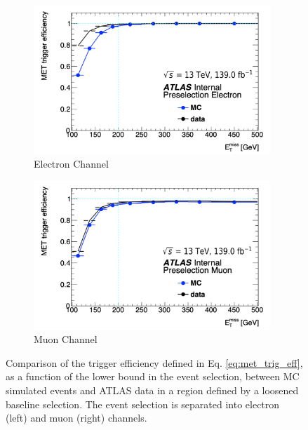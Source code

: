\begin{figure}[htbp]
  \centering
     \begin{subfigure}{0.49\textwidth}
     \includegraphics[width = 0.98\textwidth]{Figures/5/METTrigger/PreE_MetTST_met.pdf}
    \caption{Electron Channel}
    \label{ig:mettrig_e}
     \end{subfigure}
    \begin{subfigure}{0.49\textwidth}
     \includegraphics[width = 0.98\textwidth]{Figures/5/METTrigger/PreM_MetTST_met.pdf}
     \caption{Muon Channel}
     \label{ig:mettrig_mu}
     \end{subfigure}
     \caption{Comparison of the \met trigger efficiency defined in Eq. \ref{eq:met_trig_eff}, as a function of the \met lower bound in the event selection, between MC simulated events and ATLAS data in a region defined by a loosened baseline selection. The event selection is separated into electron (left) and muon (right) channels.}
     \label{fig:mettrig}
  \end{figure}
  
